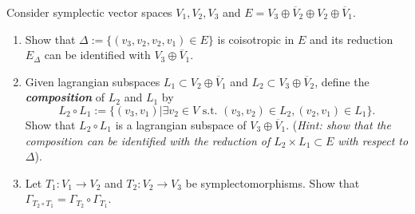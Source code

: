 Consider symplectic vector spaces  $V_1,V_2,V_3$ and $E=V_3\oplus \overline{ V}_{2}\oplus V_2\oplus \overline{V}_1$.
\begin{enumerate}[label=\alph*.]
	\item Show that $\Delta :=\{(v_3,v_2,v_2,v_1)\in E\} $ is coisotropic in $E$ and its reduction $E_{\Delta}$ can be identified with $V_3\oplus \overline{V}_{1}$.

	\item Given lagrangian subspaces $L_1\subset V_2\oplus \overline{V}_{1}$ and $L_2\subset  V_3\oplus \overline{V}_{2}$, define the \textit{\textbf{composition}} of $L_2$ and $L_1$ by
		\[L_2\circ L_1:=\{(v_3,v_1)|\exists v_2\in V\text{ s.t. } (v_3,v_2)\in L_2,(v_2,v_1)\in L_1\}. \]
		Show that $L_2\circ L_1$ is a lagrangian subspace of $V_3\oplus \overline{V}_{1}$. (\textit{Hint: show that the composition can be identified with the reduction of $L_2\times L_1\subset E$ with respect to $\Delta$}).

	\item Let $T_1:V_1\to V_2$ and  $T_2:V_2\to V_3$ be symplectomorphisms. Show that $\Gamma_{T_2\circ T_1}=\Gamma_{T_2}\circ \Gamma_{T_1}$.
\end{enumerate}

